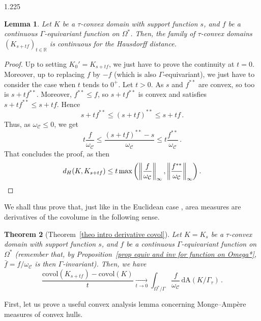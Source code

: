 \documentclass[reqno, a4paper]{amsart}
\numberwithin{equation}{section}
\numberwithin{figure}{section}
\newtheorem{theorem}{Theorem}[section]
\newtheorem{lemma}[theorem]{Lemma}
\theoremstyle{definition}
\theoremstyle{remark}
\newcommand{\R}{\mathbb{R}} %
\newcommand{\dif}{\mathrm{d}} %
\newcommand{\C}{\mathcal{C}} %
\newcommand{\covol}{\mathrm{covol}} %
\newcommand{\Area}{\mathrm{A}} %
\newcommand{\vp}[1]{{\left( {#1} \right)}} %
\begin{document}
\begin{spacing}{1.225}
\begin{lemma}
\label{lemma Hausdorff cv of Ks+tf}
Let $K$ be a $\tau$-convex domain with support function $s$, and $f$ be a continuous $\Gamma$-equivariant function on $\Omega^*$. Then, the family of $\tau$-convex domains $(K_{s+tf})_{t\in\R}$ is continuous for the Hausdorff distance. 
\end{lemma}
\begin{proof}
Up to setting $K_0' = K_{s+ tf}$, we just have to prove the continuity at $t = 0$. Moreover, up to replacing $f$ by $-f$ (which is also $\Gamma$-equivariant), we just have to consider the case when $t$ tends to $0^+$. Let $t>0$. As $s$ and $f^{**}$ are convex, so too is $s+tf^{**}$. Moreover, $f^{**}\leq f$, so $s+tf^{**}$ is convex and satisfies $s+tf^{**} \leq s+tf$. Hence
\begin{equation*}
 s+tf^{**} \leq (s+tf)^{**} \leq s+tf \, . 
\end{equation*}
Thus, as $\omega_\C \leq 0$, we get 
\begin{equation*}
 t\frac{f}{\omega_\C} \leq \frac{(s+tf)^{**}-s}{\omega_\C} \leq t\frac{f^{**}}{\omega_\C} \, . 
\end{equation*}
That concludes the proof, as then
\begin{equation*}
 d_H(K,K_{s+tf}) \leq t \max \vp{\left\Vert\frac{f}{\omega_\C} \right\Vert_\infty , \left\Vert\frac{f^{**}}{\omega_\C} \right\Vert_\infty} \, . \qedhere
\end{equation*}
\end{proof}

We shall thus prove that, just like in the Euclidean case \cite[Proposition~2]{Carlier_03}, area measures are derivatives of the covolume in the following sense. 

\begin{theorem}[Theorem~\ref{theo intro derivative covol}]
\label{theo area measure as gateau derivative}
Let $K=K_s$ be a $\tau$-convex domain with support function $s$, and $f$ be a continuous $\Gamma$-equivariant function on $\Omega^*$ (remember that, by Proposition~\ref{prop equiv and inv for function on Omega*}, $\bar f = f/\omega_\C$ is then $\Gamma$-invariant). Then, we have 
\begin{equation*}
\frac{\covol (K_{s+tf})-\covol(K)}{t} \xrightarrow[t \to 0]{} \int_{\Omega^*/\Gamma} \frac{f}{\omega_\C} \, \dif \Area(K/\Gamma_\tau) \, . 
 \end{equation*}
\end{theorem}

First, let us prove a useful convex analysis lemma concerning Monge--Amp\`ere measures of convex hulls. 


\end{spacing}
\end{document}

